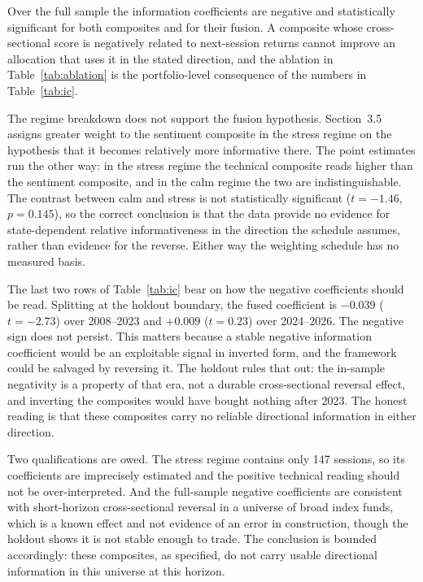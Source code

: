 \documentclass{singlecol-new}
\theoremstyle{TH}{
\newtheorem{lemma}{Lemma}
\newtheorem{theorem}[lemma]{Theorem}
\newtheorem{corrolary}[lemma]{Corrolary}
\newtheorem{conjecture}[lemma]{Conjecture}
\newtheorem{proposition}[lemma]{Proposition}
\newtheorem{claim}[lemma]{Claim}
\newtheorem{stheorem}[lemma]{Wrong Theorem}
\newtheorem{algorithm}{Algorithm}
}
\theoremstyle{THrm}{
\newtheorem{definition}{Definition}[section]
\newtheorem{question}{Question}[section]
\newtheorem{remark}{Remark}
\newtheorem{scheme}{Scheme}
}
\theoremstyle{THhit}{
\newtheorem{case}{Case}[section]
}
\begin{document}
Over the full sample the information coefficients are negative and statistically
significant for both composites and for their fusion. A composite whose cross-sectional
score is negatively related to next-session returns cannot improve an allocation that
uses it in the stated direction, and the ablation in Table~\ref{tab:ablation} is the
portfolio-level consequence of the numbers in Table~\ref{tab:ic}.

The regime breakdown does not support the fusion hypothesis. Section~3.5 assigns greater
weight to the sentiment composite in the stress regime on the hypothesis that it
becomes relatively more informative there. The point estimates run the other way: in the
stress regime the technical composite reads higher than the sentiment composite, and
in the calm regime the two are indistinguishable. The contrast between calm and stress is
not statistically significant ($t = -1.46$, $p = 0.145$), so the correct conclusion is
that the data provide no evidence for state-dependent relative informativeness in the
direction the schedule assumes, rather than evidence for the reverse. Either way the
weighting schedule has no measured basis.

The last two rows of Table~\ref{tab:ic} bear on how the negative coefficients should be
read. Splitting at the holdout boundary, the fused coefficient is $-0.039$ ($t = -2.73$)
over 2008--2023 and $+0.009$ ($t = 0.23$) over 2024--2026. The negative sign does not
persist. This matters because a stable negative information coefficient would be an
exploitable signal in inverted form, and the framework could be salvaged by reversing it.
The holdout rules that out: the in-sample negativity is a property of that era, not a
durable cross-sectional reversal effect, and inverting the composites would have bought
nothing after 2023. The honest reading is that these composites carry no reliable
directional information in either direction.

Two qualifications are owed. The stress regime contains only 147 sessions, so its
coefficients are imprecisely estimated and the positive technical reading should not be
over-interpreted. And the full-sample negative coefficients are consistent with
short-horizon cross-sectional reversal in a universe of broad index funds, which is a
known effect and not evidence of an error in construction, though the holdout shows it is
not stable enough to trade. The conclusion is bounded accordingly: these composites, as
specified, do not carry usable directional information in this universe at this
horizon.
\end{document}
